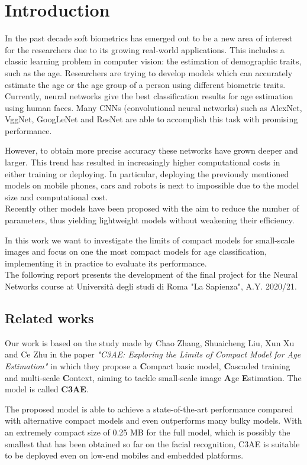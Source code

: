 
\chapter{Introduction}
In the past decade soft biometrics has emerged out to be a new area of interest for the researchers due to its growing real-world 
applications. This includes a classic learning problem in computer vision: the estimation of demographic traits, such as the age. 
Researchers are trying to develop models which can accurately estimate the age or the age group of a person using different 
biometric traits. Currently, neural networks give the best classification results for age estimation using human faces.
Many CNNs (convolutional neural networks) such as AlexNet, VggNet, GoogLeNet and ResNet are able to accomplish this task with promising 
performance.\

However, to obtain more precise accuracy these networks have grown deeper and larger. This trend has resulted in increasingly higher 
computational costs in either training or deploying. In particular, deploying the previously mentioned models on mobile phones, cars and 
robots is next to impossible due to the model size and computational cost.\\
Recently other models have been proposed with the aim to reduce the number of parameters, thus yielding lightweight models without 
weakening their efficiency.

In this work we want to investigate the limits of compact models for small-scale images and focus on one the most compact models for age 
classification, implementing it in practice to evaluate its performance.\\
The following report presents the development of the final project for the Neural Networks course at Università degli studi di Roma 
"La Sapienza", A.Y. 2020/21.

\section{Related works}

Our work is based on the study made by Chao Zhang, Shuaicheng Liu, Xun Xu and Ce Zhu in the paper \textit{"C3AE: Exploring the Limits 
of Compact Model for Age Estimation"} \cite{c3ae} in which they propose a \textbf{C}ompact basic model, \textbf{C}ascaded training 
and multi-scale \textbf{C}ontext, aiming to tackle small-scale image \textbf{A}ge \textbf{E}stimation. The model is called \textbf{C3AE}.

The proposed model is able to achieve a state-of-the-art performance compared with alternative compact models and even outperforms many 
bulky models. With an extremely compact size of 0.25 MB for the full model, which is possibly the smallest that has been
obtained so far on the facial recognition, C3AE is suitable to be deployed even on low-end mobiles and embedded platforms.
